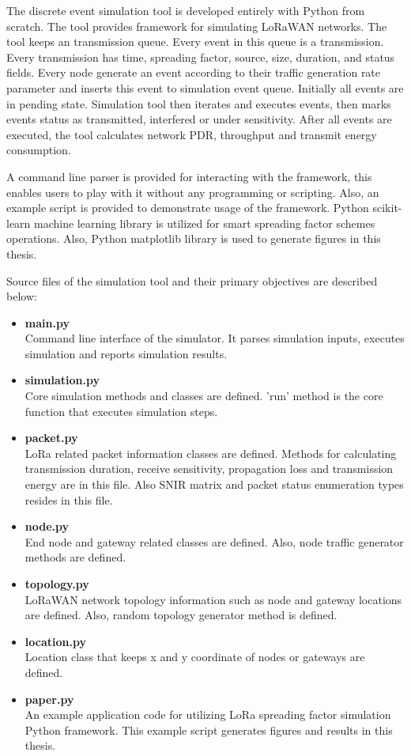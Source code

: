 The discrete event simulation tool is developed entirely with Python from scratch. The tool provides framework for simulating LoRaWAN networks. The tool keeps an transmission queue. Every event in this queue is a transmission. Every transmission has time, spreading factor, source, size, duration, and status fields. Every node generate an event according to their traffic generation rate parameter and inserts this event to simulation event queue. Initially all events are in pending state. Simulation tool then iterates and executes events, then marks events status as transmitted, interfered or under sensitivity. After all events are executed, the tool calculates network PDR, throughput and transmit energy consumption.

A command line parser is provided for interacting with the framework, this enables users to play with it without any programming or scripting. Also, an example script is provided to demonstrate usage of the framework. Python scikit-learn machine learning library is utilized for smart spreading factor schemes operations. Also, Python matplotlib library is used to generate figures in this thesis.

Source files of the simulation tool and their primary objectives are described below:

\begin{itemize}
  \item \textbf{main.py} \\ Command line interface of the simulator. It parses simulation inputs, executes simulation and reports simulation results.
  \item \textbf{simulation.py} \\ Core simulation methods and classes are defined. 'run' method is the core function that executes simulation steps.
  \item \textbf{packet.py} \\ LoRa related packet information classes are defined. Methods for calculating transmission duration, receive sensitivity, propagation loss and transmission energy are in this file. Also SNIR matrix and packet status enumeration types resides in this file.
  \item \textbf{node.py} \\ End node and gateway related classes are defined. Also, node traffic generator methods are defined.
  \item \textbf{topology.py} \\ LoRaWAN network topology information such as node and gateway locations are defined. Also, random topology generator method is defined.
  \item \textbf{location.py} \\ Location class that keeps x and y coordinate of nodes or gateways are defined.
  \item \textbf{paper.py} \\ An example application code for utilizing LoRa spreading factor simulation Python framework. This example script generates figures and results in this thesis.
\end{itemize}

